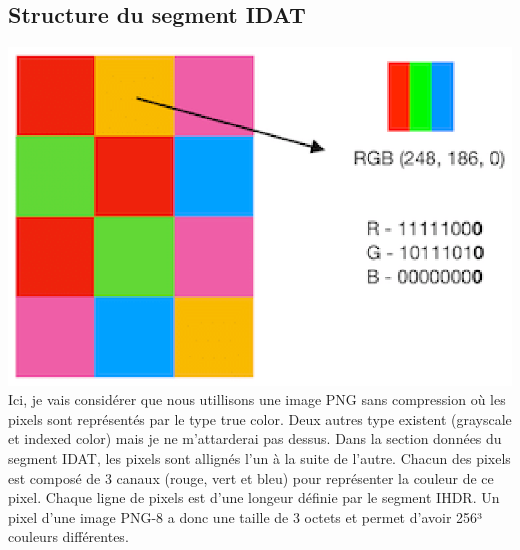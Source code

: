 \subsection{Structure du segment IDAT}
\includegraphics[width=1\textwidth]{img/RGB-png-bit-pixel-mode.eps}
Ici, je vais considérer que nous utillisons une image PNG sans compression où les pixels sont représentés par le type true color. Deux autres type existent (grayscale et indexed color) mais je ne m'attarderai pas dessus.
\newline
Dans la section données du segment IDAT, les pixels sont allignés l'un à la suite de l'autre. Chacun des pixels est composé de 3 canaux (rouge, vert et bleu) pour représenter la couleur de ce pixel. Chaque ligne de pixels est d'une longeur définie par le segment IHDR.
\newline
Un pixel d'une image PNG-8 a donc une taille de 3 octets et permet d'avoir 256³ couleurs différentes.
